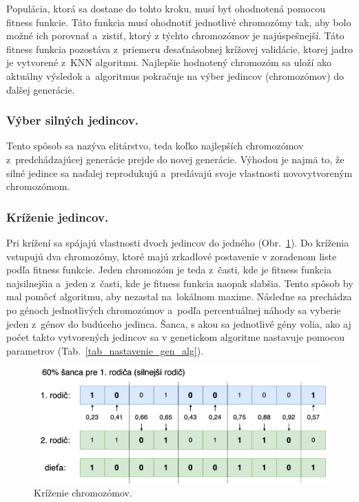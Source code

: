 \documentclass[runningheads]{llncs}
\begin{document}
Populácia, ktorá sa dostane do tohto kroku, musí byť ohodnotená pomocou fitness funkcie. 
Táto funkcia musí ohodnotiť jednotlivé chromozómy tak, aby bolo možné ich porovnať a~zistiť, ktorý
z týchto chromozómov je najúspešnejší. Táto fitness funkcia pozostáva z~priemeru ďesaťnásobnej krížovej validácie, ktorej jadro
je vytvorené z~KNN algoritmu. Najlepšie hodnotený chromozóm sa uloží ako aktuálny výsledok a~algoritmus pokračuje
na výber jedincov (chromozómov) do ďalšej generácie.

\subsubsection{Výber silných jedincov.}

Tento spôsob sa nazýva elitárstvo, teda koľko najlepších chromozómov z~predchádzajúcej generácie prejde
do novej generácie. Výhodou je najmä to, že silné jedince sa naďalej reprodukujú a~predávajú svoje vlastnosti
novovytvoreným chromozómom.

\subsubsection{Kríženie jedincov.}

Pri krížení sa spájajú vlastnosti dvoch jedincov do jedného (Obr.~\ref{fig_ga_krizenie}).
Do kríženia vstupujú dva chromozómy, ktoré majú zrkadlové postavenie v zoradenom liste podľa fitness funkcie. 
Jeden chromozóm je teda z~časti, kde je fitness funkcia najsilnejšia a~jeden z~časti, kde je fitness funkcia naopak slabšia. 
Tento spôsob by mal pomôcť algoritmu, aby nezastal na~lokálnom maxime. Následne sa prechádza po génoch 
jednotlivých chromozómov a~podľa percentuálnej náhody sa vyberie jeden z~génov do budúceho jedinca.
Šanca, s akou sa jednotlivé gény volia, ako aj počet takto vytvorených jedincov sa v genetickom algoritme
nastavuje pomocou parametrov (Tab.~\ref{tab_nastavenie_gen_alg}). 

\begin{figure}
\includegraphics[width=\textwidth]{image/krizenie.png}
\caption{Kríženie chromozómov.} \label{fig_ga_krizenie}
\end{figure}
\end{document}
